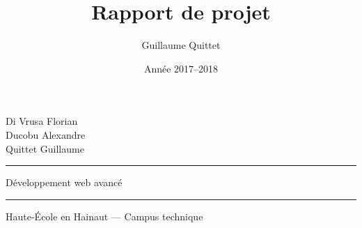\documentclass[11pt]{article}
\newcommand{\cours}{Développement web avancé}
\renewcommand{\maketitle}{
    \thispagestyle{empty}
    \begin{center}
        Di Vrusa Florian \hfill \thedate{} \\
        Ducobu Alexandre \hfill \null \\
        Quittet Guillaume \hfill \null
        \vfill
        \hrule
        \vspace{1.0cm}
        {\Huge\cours{}}\\
        \vspace{0.7cm}
        {\LARGE\textit{\thetitle}}
        \vspace{1.0cm}
        \hrule
        \vfill
        Haute-École en Hainaut --- Campus technique
    \end{center}
    \clearpage
}
\newcommand{\partie}[1]{
	
	\clearpage
}
\begin{document}
	
	\author{Guillaume Quittet}
	\date{Année 2017--2018}
	\title{Rapport de projet}
	
	\maketitle
	
	\tableofcontents
	\clearpage
	
	\partie{introduction}
	\partie{technologies-utilisees}
	\partie{outils}
	\partie{déroulement}
	\partie{problemes}
	\partie{conclusion}
		
	\nocite{heh-logo}
	
	
	
\end{document}
